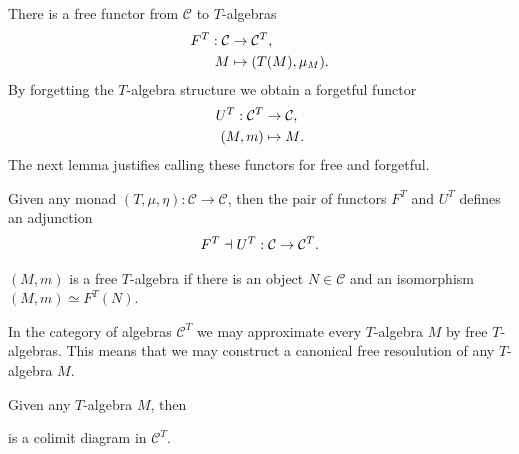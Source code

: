 \documentclass[../thesis.tex]{subfiles}
\begin{document}
        There is a free functor from $\mathcal{C}$ to $T$-algebras
        \begin{align*}
            F^T : \mathcal{C} & \rightarrow \mathcal{C}^T\tt{,} \\
            M & \mapsto (T(M), \mu_M)\tt{.}
        \end{align*}
        By forgetting the $T$-algebra structure we obtain a forgetful functor
        \begin{align*}
            U^T : \mathcal{C}^T & \rightarrow \mathcal{C}\tt{,} \\
            (M, m) & \mapsto M\tt{.}
        \end{align*}
        The next lemma justifies calling these functors for free and forgetful.        
        \begin{lemma}
            Given any monad $(T, \mu, \eta) : \mathcal{C} \rightarrow \mathcal{C}$, then the pair of functors $F^T$ and $U^T$ defines an adjunction
            \begin{align*}
                F^T \dashv U^T : \mathcal{C} \rightarrow \mathcal{C}^T\tt{.}
            \end{align*}
        \end{lemma}

        \begin{definition}
            $(M,m)$ is a free $T$-algebra if there is an object $N\in \mathcal{C}$ and an isomorphism $(M,m) \simeq F^T(N)$.
        \end{definition}
        In the category of algebras $\mathcal{C}^T$ we may approximate every $T$-algebra $M$ by free $T$-algebras. This means that we may construct a canonical free resoulution of any $T$-algebra $M$.
        \begin{proposition}
            Given any $T$-algebra $M$, then
            \begin{center}
            \end{center}
            is a colimit diagram in $\mathcal{C}^T$.
        \end{proposition} 
\end{document}
